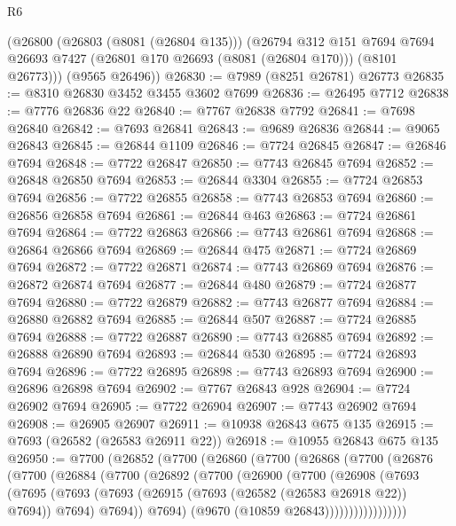 \begin{lexlean}{R6}
\begin{coremodule}
      (@26800
        (@26803 (@8081 (@26804 @135)))
        (@26794
          @312
          @151
          @7694
          @7694
          @26693
          @7427
          (@26801 @170 @26693 (@8081 (@26804 @170)))
          (@8101 @26773)))
      (@9565 @26496))
@26830 := @7989 (@8251 @26781) @26773
@26835 := @8310 @26830 @3452 @3455 @3602 @7699
@26836 := @26495 @7712
@26838 := @7776 @26836 @22
@26840 := @7767 @26838 @7792
@26841 := @7698 @26840
@26842 := @7693 @26841
@26843 := @9689 @26836
@26844 := @9065 @26843
@26845 := @26844 @1109
@26846 := @7724 @26845
@26847 := @26846 @7694
@26848 := @7722 @26847
@26850 := @7743 @26845 @7694
@26852 := @26848 @26850 @7694
@26853 := @26844 @3304
@26855 := @7724 @26853 @7694
@26856 := @7722 @26855
@26858 := @7743 @26853 @7694
@26860 := @26856 @26858 @7694
@26861 := @26844 @463
@26863 := @7724 @26861 @7694
@26864 := @7722 @26863
@26866 := @7743 @26861 @7694
@26868 := @26864 @26866 @7694
@26869 := @26844 @475
@26871 := @7724 @26869 @7694
@26872 := @7722 @26871
@26874 := @7743 @26869 @7694
@26876 := @26872 @26874 @7694
@26877 := @26844 @480
@26879 := @7724 @26877 @7694
@26880 := @7722 @26879
@26882 := @7743 @26877 @7694
@26884 := @26880 @26882 @7694
@26885 := @26844 @507
@26887 := @7724 @26885 @7694
@26888 := @7722 @26887
@26890 := @7743 @26885 @7694
@26892 := @26888 @26890 @7694
@26893 := @26844 @530
@26895 := @7724 @26893 @7694
@26896 := @7722 @26895
@26898 := @7743 @26893 @7694
@26900 := @26896 @26898 @7694
@26902 := @7767 @26843 @928
@26904 := @7724 @26902 @7694
@26905 := @7722 @26904
@26907 := @7743 @26902 @7694
@26908 := @26905 @26907
@26911 := @10938 @26843 @675 @135
@26915 := @7693 (@26582 (@26583 @26911 @22))
@26918 := @10955 @26843 @675 @135
@26950 := @7700
    (@26852
      (@7700
        (@26860
          (@7700
            (@26868
              (@7700
                (@26876
                  (@7700
                    (@26884
                      (@7700
                        (@26892
                          (@7700
                            (@26900
                              (@7700
                                (@26908
                                  (@7693
                                    (@7695
                                      (@7693
                                        (@7693
                                          (@26915 (@7693 (@26582 (@26583 @26918 @22)) @7694))
                                          @7694)
                                        @7694))
                                    @7694)
                                  (@9670 (@10859 @26843)))))))))))))))))

\end{coremodule}
\end{lexlean}
